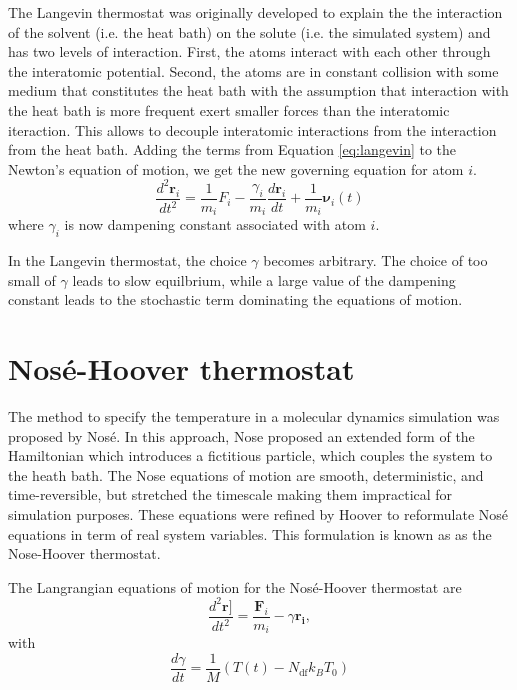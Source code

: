 The Langevin thermostat\cite{grest1986_langevin} was originally developed to explain the the interaction of the solvent (i.e. the heat bath) on the solute (i.e. the simulated system) and has two levels of interaction.  First, the atoms interact with each other through the interatomic potential.  Second, the atoms are in constant collision with some medium that constitutes the heat bath with the assumption that interaction with the heat bath is more frequent exert smaller forces than the interatomic iteraction.  This allows to decouple interatomic interactions from the interaction from the heat bath.  Adding the terms from Equation \ref{eq:langevin} to the Newton's equation of motion, we get the new governing equation for atom $i$.
\begin{equation}
  \label{eq:langevin_eos}
  \frac{d^2\bm{r}_i}{dt^2}
  =
  \frac{1}{m_i} F_i
  - \frac{\gamma_i}{m_i} \frac{d \bm{r}_i}{dt}
  + \frac{1}{m_i} \bm{\nu}_i(t)
\end{equation}
where $\gamma_i$ is now dampening constant associated with atom $i$.

In the Langevin thermostat, the choice $\gamma$ becomes arbitrary.  The choice of too small of $\gamma$ leads to slow equilbrium, while a large value of the dampening constant leads to the stochastic term dominating the equations of motion.

\section{Nos\'e-Hoover thermostat}
The method to specify the temperature in a molecular dynamics simulation was proposed by Nos\'e\cite{nose1984_npt_1,nose1984_npt_2}.  In this approach, Nose proposed an extended form of the Hamiltonian which introduces a fictitious particle, which couples the system to the heath bath.  The Nose equations of motion are smooth, deterministic, and time-reversible, but stretched the timescale making them impractical for simulation purposes.  These equations were refined by Hoover\cite{hoover1985_npt} to reformulate Nos\'e equations in term of real system variables.  This formulation is known as as the Nose-Hoover thermostat.

The Langrangian equations of motion for the Nos\'e-Hoover thermostat are
\begin{equation}
  \label{eq:nose_hoover_1}
  \frac{d^2\bm{r]}}
       {dt^2}
  =
  \frac{\bm{F}_i}{m_i} - \gamma \bm{r_i},
\end{equation}
with
\begin{equation}
  \label{eq:nose_hoover_2}
  \frac{d\gamma}{dt}
  =
  \frac{1}{M}
   \left(
       T(t) - N_{\mathrm{df}} k_B T_0
   \right)
\end{equation}

